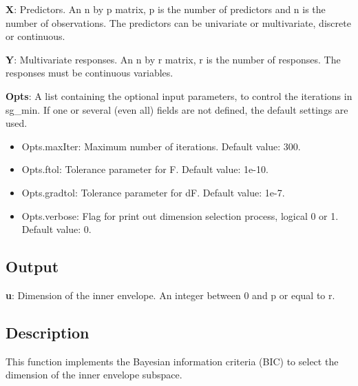 \documentclass[a4paper,11pt,openany]{memoir}
\begin{document}
\begin{par}
\textbf{X}: Predictors. An n by p matrix, p is the number of predictors and n is the number of observations. The predictors can be univariate or multivariate, discrete or continuous.
\end{par} \vspace{1em}
\begin{par}
\textbf{Y}: Multivariate responses. An n by r matrix, r is the number of responses. The responses must be continuous variables.
\end{par} \vspace{1em}
\begin{par}
\textbf{Opts}: A list containing the optional input parameters, to control the iterations in sg\_min. If one or several (even all) fields are not defined, the default settings are used.
\end{par} \vspace{1em}
\begin{itemize}
\setlength{\itemsep}{-1ex}
   \item Opts.maxIter: Maximum number of iterations.  Default value: 300.
   \item Opts.ftol: Tolerance parameter for F.  Default value: 1e-10.
   \item Opts.gradtol: Tolerance parameter for dF.  Default value: 1e-7.
   \item Opts.verbose: Flag for print out dimension selection process, logical 0 or 1. Default value: 0.
\end{itemize}


\subsection*{Output}

\begin{par}
\textbf{u}: Dimension of the inner envelope. An integer between 0 and p or equal to r.
\end{par} \vspace{1em}


\subsection*{Description}

\begin{par}
This function implements the Bayesian information criteria (BIC) to select the dimension of the inner envelope subspace.
\end{par} \vspace{1em}
\end{document}
